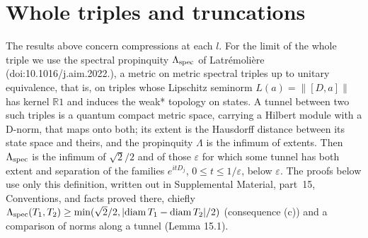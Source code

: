 \documentclass[aps,prd,reprint,onecolumn,nofootinbib,amsmath,amssymb,floatfix]{revtex4-2}
\theoremstyle{plain}
\newcommand{\supp}[1]{Supplemental Material, part~#1}
\newcommand{\Lspec}{\Lambda_{\rm spec}}
\begin{document}
\section{Whole triples and truncations}

The results above concern compressions at each $l$. For the limit of the whole triple we use the spectral propinquity $\Lspec$ of Latr\'emoli\`ere \cite{Lat2022} (doi:10.1016/\allowbreak j.aim.2022.), a metric on metric spectral triples up to unitary equivalence, that is, on triples whose Lipschitz seminorm $L(a)=\|[D,a]\|$ has kernel $\mathbb R1$ and induces the weak* topology on states. A tunnel between two such triples is a quantum compact metric space, carrying a Hilbert module with a D-norm, that maps onto both; its extent is the Hausdorff distance between its state space and theirs, and the propinquity $\Lambda$ is the infimum of extents. Then $\Lspec$ is the infimum of $\sqrt2/2$ and of those $\varepsilon$ for which some tunnel has both extent and separation of the families $e^{itD_j}$, $0\le t\le1/\varepsilon$, below $\varepsilon$. The proofs below use only this definition, written out in \supp{15}, Conventions, and facts proved there, chiefly $\Lspec(T_1,T_2)\ge\min(\sqrt2/2,|\mathrm{diam}\,T_1-\mathrm{diam}\,T_2|/2)$ (consequence (c)) and a comparison of norms along a tunnel (Lemma 15.1).
\end{document}

